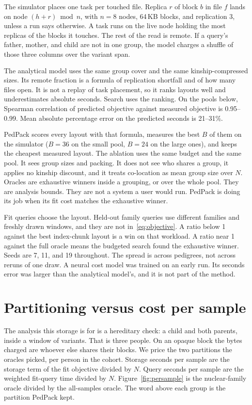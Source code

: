\documentclass[11pt]{article}
\begin{document}
The simulator places one task per touched file.
Replica $r$ of block $b$ in file $f$ lands on node $(h + r) \bmod n$, with $n = 8$ nodes, 64\,KB blocks, and replication 3, unless a run says otherwise.
A task runs on the live node holding the most replicas of the blocks it touches.
The rest of the read is remote.
If a query's father, mother, and child are not in one group, the model charges a shuffle of those three columns over the variant span.

The analytical model uses the same group cover and the same kinship-compressed sizes.
Its remote fraction is a formula of replication shortfall and of how many files open.
It is not a replay of task placement, so it ranks layouts well and underestimates absolute seconds.
Search uses the ranking.
On the pools below, Spearman correlation of predicted objective against measured objective is 0.95--0.99.
Mean absolute percentage error on the predicted seconds is 21--31\%.

PedPack scores every layout with that formula, measures the best $B$ of them on the simulator ($B = 36$ on the small pool, $B = 24$ on the large ones), and keeps the cheapest measured layout.
The ablation uses the same budget and the same pool.
It sees group sizes and packing.
It does not see who shares a group, it applies no kinship discount, and it treats co-location as mean group size over $N$.
Oracles are exhaustive winners inside a grouping, or over the whole pool.
They are analysis bounds.
They are not a system a user would run.
PedPack is doing its job when its fit cost matches the exhaustive winner.

Fit queries choose the layout.
Held-out family queries use different families and freshly drawn windows, and they are not in~\eqref{eq:objective}.
A ratio below 1 against the best index-chunk layout is a win on that workload.
A ratio near 1 against the full oracle means the budgeted search found the exhaustive winner.
Seeds are 7, 11, and 19 throughout.
The spread is across pedigrees, not across reruns of one draw.
A neural cost model was trained on an early run.
Its seconds error was larger than the analytical model's, and it is not part of the method.

\section{Partitioning versus cost per sample}
\label{sec:persample}

The analysis this storage is for is a hereditary check: a child and both parents, inside a window of variants.
That is three people.
On an opaque block the bytes charged are whoever else shares their blocks.
We price the two partitions the oracles picked, per person in the cohort.
Storage seconds per sample are the storage term of the fit objective divided by $N$.
Query seconds per sample are the weighted fit-query time divided by $N$.
Figure~\ref{fig:persample} is the nuclear-family oracle divided by the all-samples oracle.
The word above each group is the partition PedPack kept.
\end{document}
